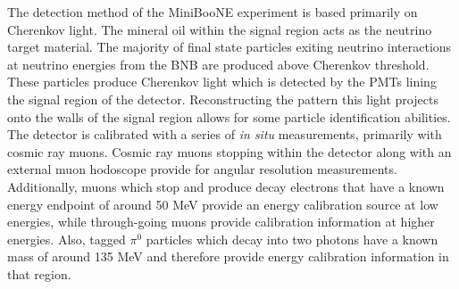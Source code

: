 The detection method of the MiniBooNE experiment is based primarily on Cherenkov light. The mineral oil within the signal region acts as the neutrino target material.  The majority of final state particles exiting neutrino interactions at neutrino energies from the BNB are produced above Cherenkov threshold. These particles produce Cherenkov light which is detected by the PMTs lining the signal region of the detector. Reconstructing the pattern this light projects onto the walls of the signal region allows for some particle identification abilities.\\




The detector is calibrated with a series of \textit{in situ} measurements, primarily with cosmic ray muons. Cosmic ray muons stopping within the detector along with an external muon hodoscope provide for angular resolution measurements. Additionally, muons which stop and produce decay electrons that have a known energy endpoint of around 50 MeV provide an energy calibration source at low energies, while through-going muons provide calibration information at higher energies. Also, tagged $\pi^0$ particles which decay into two photons have a known mass of around 135 MeV and therefore provide energy calibration information in that region.\\

